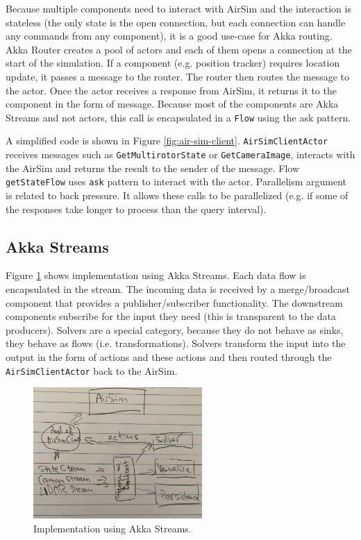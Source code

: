 \documentclass{article}
\begin{document}
Because multiple components need to interact with AirSim and the interaction is stateless (the only state is the open connection, but each connection can handle any commands from any component), it is a good use-case for Akka routing. Akka Router creates a pool of actors and each of them opens a connection at the start of the simulation. If a component (e.g. position tracker) requires location update, it passes a message to the router. The router then routes the message to the actor. Once the actor receives a response from AirSim, it returns it to the component in the form of message. Because most of the components are Akka Streams and not actors, this call is encapsulated in a \verb|Flow| using the ask pattern. 

A simplified code is shown in Figure \ref{fig:air-sim-client}. \verb|AirSimClientActor| receives messages such as \verb|GetMultirotorState| or \verb|GetCameraImage|, interacts with the AirSim and returns the result to the sender of the message. Flow \verb|getStateFlow| uses \verb|ask| pattern to interact with the actor. Parallelism argument is related to back pressure. It allows these calls to be parallelized (e.g. if some of the responses take longer to process than the query interval).

\subsection{Akka Streams}
Figure \ref{fig:with-flow} shows implementation using Akka Streams. Each data flow is encapsulated in the stream. The incoming data is received by a merge/broadcast component that provides a publisher/subscriber functionality. The downstream components subscribe for the input they need (this is transparent to the data producers). Solvers are a special category, because they do not behave as sinks, they behave as flows (i.e. transformations). Solvers transform the input into the output in the form of actions and these actions and then routed through the \verb|AirSimClientActor| back to the AirSim.

\begin{figure}
	\centering
	\includegraphics[height=5cm]{with-flow}
	\caption{Implementation using Akka Streams.}\label{fig:with-flow}
\end{figure}
\end{document}
